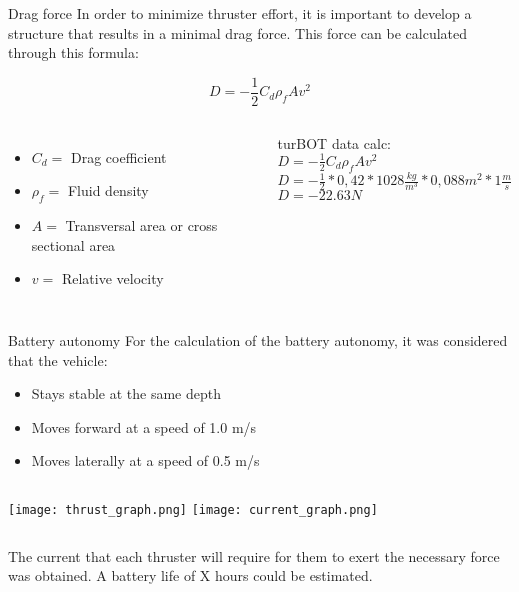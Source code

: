 \begin{frame}[c]{Drag force}
  In order to minimize thruster effort, it is important to develop a structure that results in a minimal drag force. This force can be calculated through this formula:   
  
  \begin{equation}
    D = -\frac{1}{2}C_{d} \rho_{f} A v^2
  \end{equation}
  \begin{columns}
      \begin{itemize}
        \item $C_{d} =$ Drag coefficient
        \item $\rho_{f} =$ Fluid density
        \item $A =$ Transversal area or cross sectional area
        \item $v =$ Relative velocity   
      \end{itemize}
    turBOT data calc: \\
      $D = -\frac{1}{2}C_{d} \rho_{f} A v^2$ \\
      $D = -\frac{1}{2} * 0,42 * 1028 \frac{kg}{m^3} * 0,088 m^2 * 1 \frac{m}{s}$ \\
      $D = -22.63 N$
  \end{columns}
  

\end{frame}

\begin{frame}[c]{Battery autonomy}
  For the calculation of the battery autonomy, it was considered that the vehicle: 
  
  \begin{itemize}
    \item Stays stable at the same depth
    \item Moves forward at a speed of 1.0 m/s
    \item Moves laterally at a speed of 0.5 m/s
  \end{itemize}

  \begin{columns}
      \texttt{[image: thrust\_graph.png]}
      \texttt{[image: current\_graph.png]}
  \end{columns}

  The current that each thruster will require for them to exert the necessary force was obtained. A battery life of X hours could be estimated.
\end{frame}

